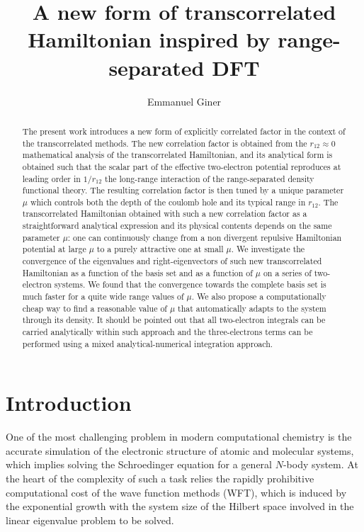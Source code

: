 \documentclass[aip,jcp,reprint,noshowkeys,superscriptaddress]{revtex4-1}
\begin{document}
	

\title{A new form of transcorrelated Hamiltonian inspired by range-separated DFT}

\author{Emmanuel Giner}

\begin{abstract}
The present work introduces a new form of explicitly correlated factor in the context of the transcorrelated methods. 
The new correlation factor is obtained from the $r_{12} \approx 0$ mathematical analysis of the transcorrelated Hamiltonian, and its analytical form is obtained such that the scalar part of the effective two-electron potential reproduces at leading order in $1/r_{12}$ the long-range interaction of the range-separated density functional theory. 
The resulting correlation factor is then tuned by a unique parameter $\mu$ which controls both the depth of the coulomb hole and its typical range in $r_{12}$. 
The transcorrelated Hamiltonian obtained with such a new correlation factor as a straightforward analytical expression and its physical contents depends on the same parameter $\mu$: one can continuously change from a non divergent repulsive Hamiltonian potential at large $\mu$ to a purely attractive one at small $\mu$. We investigate the convergence of the eigenvalues and right-eigenvectors of such new transcorrelated Hamiltonian as a function of the basis set and as a function of $\mu$ on a series of two-electron systems. 
We found that the convergence towards the complete basis set is much faster for a quite wide range values of $\mu$. We also propose a computationally cheap way to find a reasonable value of $\mu$ that automatically adapts to the system through its density.  
It should be pointed out that all two-electron integrals can be carried analytically within such approach and the three-electrons terms can be performed using a mixed analytical-numerical integration approach.

\end{abstract}

\maketitle
\section{Introduction}
One of the most challenging problem in modern computational chemistry is the accurate simulation of the electronic structure of atomic and molecular systems, which implies solving the Schroedinger equation for a general $N$-body system. 
At the heart of the complexity of such a task relies the rapidly prohibitive computational cost of the wave function methods (WFT), which is induced by the exponential growth with the system size of the Hilbert space involved in the linear eigenvalue problem to be solved. 
\end{document}
